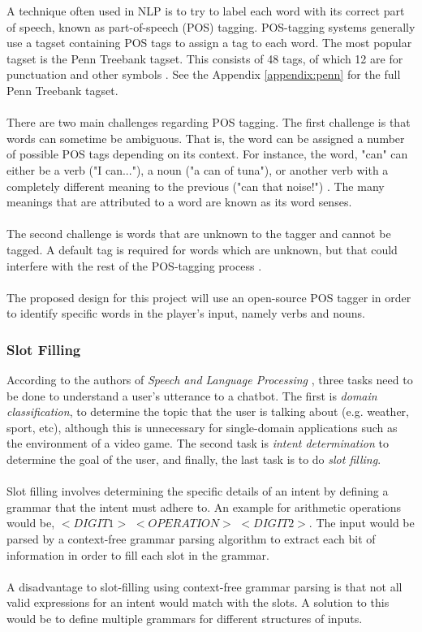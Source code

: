 \documentclass[11pt]{article}
\begin{document}
A technique often used in NLP is to try to label each word with its correct part of speech, known as part-of-speech (POS) tagging. POS-tagging systems generally use a tagset containing POS tags to assign a tag to each word. The most popular tagset is the Penn Treebank tagset. This consists of 48 tags, of which 12 are for punctuation and other symbols \cite{RefWorks:41}. See the Appendix \ref{appendix:penn} for the full Penn Treebank tagset.
\\
\\
There are two main challenges regarding POS tagging. The first challenge is that words can sometime be ambiguous. That is, the word can be assigned a number of possible POS tags depending on its context. For instance, the word, "can" can either be a verb ("I can..."), a noun ("a can of tuna"), or another verb with a completely different meaning to the previous ("can that noise!") \cite{RefWorks:43}. The many meanings that are attributed to a word are known as its word senses.
\\
\\
The second challenge is words that are unknown to the tagger and cannot be tagged. A default tag is required for words which are unknown, but that could interfere with the rest of the POS-tagging process \cite{RefWorks:41}.
\\
\\
The proposed design for this project will use an open-source POS tagger in order to identify specific words in the player's input, namely verbs and nouns.

\subsubsection{Slot Filling}

According to the authors of \textit{Speech and Language Processing} \cite{RefWorks:107}, three tasks need to be done to understand a user's utterance to a chatbot. The first is \textit{domain classification}, to determine the topic that the user is talking about (e.g. weather, sport, etc), although this is unnecessary for single-domain applications such as the environment of a video game. The second task is \textit{intent determination} to determine the goal of the user, and finally, the last task is to do \textit{slot filling}.
\\
\\
Slot filling involves determining the specific details of an intent by defining a grammar that the intent must adhere to. An example for arithmetic operations would be, $<DIGIT1>$ $<OPERATION>$ $<DIGIT2>$. The input would be parsed by a context-free grammar parsing algorithm to extract each bit of information in order to fill each slot in the grammar.
\\
\\
A disadvantage to slot-filling using context-free grammar parsing is that not all valid expressions for an intent would match with the slots. A solution to this would be to define multiple grammars for different structures of inputs.
\end{document}
